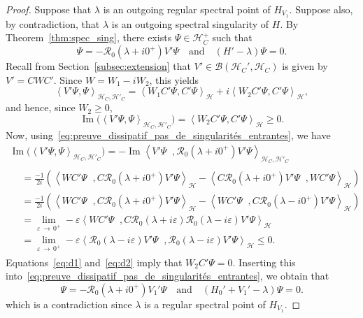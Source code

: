 \documentclass[10pt]{amsart}
\theoremstyle{definition}\newtheorem{defi}[theo]{Definition}\newtheorem{rema}[theo]{Remark}\newtheorem{exam}[theo]{Example}\newtheorem{exem}[theo]{Example}\newtheorem{nota}[theo]{Notation}
\newcommand{\Hi}{\mathcal{H}}
\newcommand{\scal}[2]{\left\langle{#1} \middle., {#2}\right\rangle}
\newcommand{\Res}{\mathcal{R}}
\newcommand{\clB}{\mathcal{B}}
\DeclareMathOperator{\im}{Im}
\begin{document}
\begin{proof}
Suppose that $\lambda$ is an outgoing regular spectral point of $H_{V_1}$. Suppose also, by contradiction, that $\lambda$ is an outgoing spectral singularity of $H$. By Theorem~\ref{thm:spec_sing}, there exists $\Psi\in\Hi_C^+$ such that
\begin{equation}\label{eq:preuve_dissipatif_pas_de_singularités_entrantes}
\Psi=-\Res_0\left(\lambda+i0^+\right)V'\Psi \quad \text{and} \quad (H'-\lambda)\Psi=0.
\end{equation}
Recall from Section~\ref{subsec:extension} that $V'\in\clB(\Hi_C',\Hi_C)$ is given by $V'=CWC'$. Since $W=W_1-iW_2$, this yields
\begin{equation*}
\left\langle V'\Psi,\Psi\right\rangle_{\Hi_C,\Hi'_C}=\left\langle W_1 C'\Psi, C'\Psi\right\rangle_\Hi+i\left\langle W_2 C'\Psi, C'\Psi\right\rangle_\Hi,
\end{equation*}
and hence, since $W_2\ge0$,
\begin{equation}\label{eq:d1}
\im\big(\left\langle V'\Psi,\Psi\right\rangle_{\Hi_C,\Hi'_C}\big)=\left\langle W_2C'\Psi, C'\Psi\right\rangle_\Hi\geq 0.
\end{equation}
Now, using~\eqref{eq:preuve_dissipatif_pas_de_singularités_entrantes}, we have
\begin{multline}\label{eq:d2}
\im\big(\left\langle V'\Psi,\Psi\right\rangle_{\Hi_C,\Hi'_C}\big)=-\im\scal{V'\Psi}{\Res_0\left(\lambda+i0^+\right)V'\Psi}_{\Hi_C,\Hi'_C} \\
\begin{aligned}
&=\frac{-1}{2i}\left(\scal{W C'\Psi}{C\Res_0\left(\lambda+i0^+\right)V'\Psi}_\Hi-\scal{C\Res_0\left(\lambda+i0^+\right)V'\Psi}{W C'\Psi}_\Hi\right)\\
&=\frac{-1}{2i}\left(\scal{W C'\Psi}{C\Res_0\left(\lambda+i0^+\right)V'\Psi}_\Hi-\scal{W C'\Psi}{C\Res_0\left(\lambda-i0^+\right)V'\Psi}_\Hi\right)\\
&=\lim_{\varepsilon\,\rightarrow\,0^+}-\varepsilon
\scal{W C'\Psi}{C\Res_0(\lambda+i\varepsilon)\Res_0(\lambda-i\varepsilon)V'\Psi}_\Hi\\
&=\lim_{\varepsilon\,\rightarrow\,0^+}-\varepsilon\scal{\Res_0(\lambda-i\varepsilon)V'\Psi}{\Res_0(\lambda-i\varepsilon)V'\Psi}_\Hi\leq 0. 
\end{aligned}
\end{multline}
Equations~\eqref{eq:d1} and~\eqref{eq:d2} imply that $W_2C'\Psi=0$. Inserting this into~\eqref{eq:preuve_dissipatif_pas_de_singularités_entrantes}, we obtain that
\begin{equation*}
\Psi=-\Res_0\left(\lambda+i0^+\right)V_1'\Psi \quad\text{and}\quad \left(H_0'+V_1'-\lambda\right)\Psi=0.
\end{equation*}
which is a contradiction since $\lambda$ is a regular spectral point of $H_{V_1}$.
\end{proof}
\end{document}
